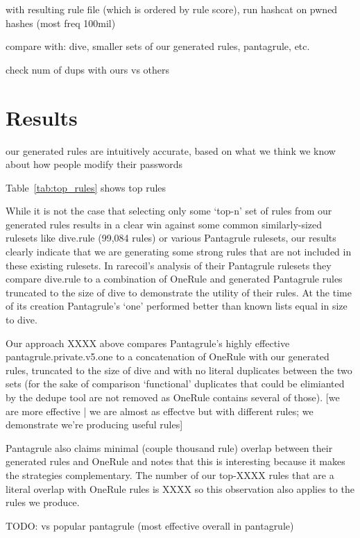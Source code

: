 \documentclass[letterpaper,twocolumn,10pt]{article}
\begin{document}
with resulting rule file (which is ordered by rule score), run hashcat on pwned
hashes (most freq 100mil)

compare with: dive, smaller sets of our generated rules, pantagrule, etc.

check num of dups with ours vs others

\section{Results}

our generated rules are intuitively accurate, based on what we think we know
about how people modify their passwords

Table~\ref{tab:top_rules} shows top rules

While it is not the case that selecting only some `top-n' set of rules from our
generated rules results in a clear win against some common similarly-sized rulesets
like dive.rule (99,084 rules) or various Pantagrule rulesets, our results clearly
indicate that we are generating some strong rules that are not included in these
existing rulesets. In rarecoil's analysis of their Pantagrule rulesets they compare
dive.rule to a combination of OneRule and generated Pantagrule rules truncated to
the size of dive to demonstrate the utility of their rules. At the time of its
creation Pantagrule's `one' performed better than known lists equal in size to dive.

Our approach XXXX above compares Pantagrule's highly effective pantagrule.private.v5.one
to a concatenation of OneRule with our generated rules, truncated to the size of dive
and with no literal duplicates between the two sets (for the sake of comparison `functional'
duplicates that could be elimianted by the dedupe tool are not removed as OneRule contains
several of those).  [we are more effective | we are almost as effectve but with different rules;
we demonstrate we're producing useful rules]

Pantagrule also claims minimal (couple thousand rule) overlap between their generated rules and OneRule
and notes that this is interesting because it makes the strategies complementary. The number of our top-XXXX rules
that are a literal overlap with OneRule rules is XXXX so this observation also applies to the rules we produce.

TODO: vs popular pantagrule (most effective overall in pantagrule)
\end{document}
